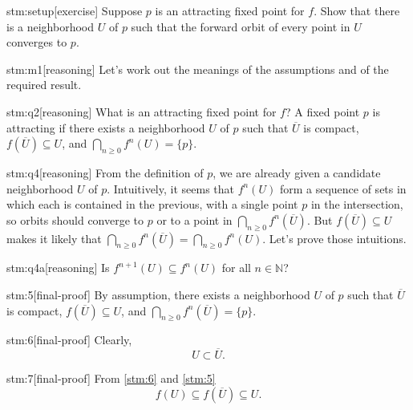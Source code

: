 \documentclass{article}
\begin{document}

\begin{stm}{stm:setup}[exercise]
Suppose $p$ is an attracting fixed point for $f$. Show that there is a neighborhood $U$ of $p$ such that the forward orbit of every point in $U$ converges to $p$.
\end{stm}


\begin{stm}{stm:m1}[reasoning]
Let's work out the meanings of the assumptions and of the required result.
\end{stm}

\begin{stm}{stm:q2}[reasoning]
What is an attracting fixed point for $f$? A fixed point $p$ is attracting if there exists a neighborhood $U$ of $p$ such that $\overline{U}$ is compact, $f(\overline{U}) \subseteq U$, and $\bigcap_{n \ge 0} f^n(U) = \{p\}$.
\end{stm}

\begin{stm}{stm:q4}[reasoning]
From the definition of $p$, we are already given a candidate neighborhood $U$ of $p$. Intuitively, it seems that $f^n(U)$ form a sequence of sets in which each is contained in the previous, with a single point $p$ in the intersection, so orbits should converge to $p$ or to a point in $\bigcap_{n \ge 0} f^n(\overline{U})$. But $f(\overline{U}) \subseteq U$ makes it likely that $\bigcap_{n \ge 0} f^n(\overline{U}) = \bigcap_{n \ge 0} f^n(U)$. Let's prove those intuitions.
\end{stm}

\begin{stm}{stm:q4a}[reasoning]
Is $f^{n+1}(U) \subseteq f^n(U)$ for all $n \in \mathbb{N}$?
\end{stm}

\begin{stm}{stm:5}[final-proof]
By assumption, there exists a neighborhood $U$ of $p$ such that $\overline{U}$ is compact, $f(\overline{U}) \subseteq U$, and $\bigcap_{n \ge 0} f^n(\overline{U}) = \{p\}$.
\end{stm}


\begin{stm}{stm:6}[final-proof]
Clearly,
$$U \subset \overline{U}.$$
\end{stm}

\begin{stm}{stm:7}[final-proof]
From \ref{stm:6} and \ref{stm:5}
$$f(U) \subseteq f(\overline{U}) \subseteq U.$$
\end{stm}
\end{document}
